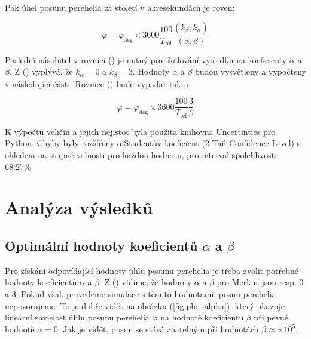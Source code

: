 \documentclass[a4paper,11pt,twocolumn]{article}
\begin{document}
            Pak úhel posunu perehelia za století v akresekundách je roven:

            \begin{equation}
                \varphi = \varphi_{\text{deg}} \times 3600 \frac{100}{T_{\text{rel}}} \frac{(k_{\beta}, k_{\alpha})}{(\alpha, \beta)}
                \label{eq:phi}
            \end{equation}

            Poslední násobitel v rovnici () je nutný pro škálování výsledku na koeficienty $\alpha$ a $\beta$. Z () vyplývá, že $k_{\alpha} = 0$ a $k_{\beta} = 3$. Hodnoty $\alpha$ a $\beta$ budou vysvětleny a vypočteny v následující části. Rovnice () bude vypadat takto:

            \begin{equation}
                \varphi = \varphi_{\text{deg}} \times 3600 \frac{100}{T_{\text{rel}}} \frac{3}{\beta}
                \label{eq:phi_final}
            \end{equation}

        K výpočtu veličin a jejich nejistot byla použita knihovna Uncertinties pro Python. Chyby byly rozšířeny o Studentův koeficient (2-Tail Confidence Level) s ohledem na stupně volnosti pro každou hodnotu, pro interval spolehlivosti 68.27\%.

    \section{Analýza výsledků}
        \subsection{Optimální hodnoty koeficientů $\alpha$ a $\beta$}

            Pro získání odpovídající hodnoty úhlu posunu perehelia je třeba zvolit potřebné hodnoty koeficientů $\alpha$ a $\beta$. Z () vidíme, že hodnoty $\alpha$ a $\beta$ pro Merkur jsou resp. 0 a 3. Pokud však provedeme simulace s těmito hodnotami, posun perehelia nepozorujeme. To je dobře vidět na obrázku (\ref{fig:phi_alpha}), který ukazuje lineární závislost úhlu posunu perehelia $\varphi$ na hodnotě koeficientu $\beta$ při pevné hodnotě $\alpha = 0$. Jak je vidět, posun se stává znatelným při hodnotách $\beta \approx \times 10^5$.
            
\end{document}
